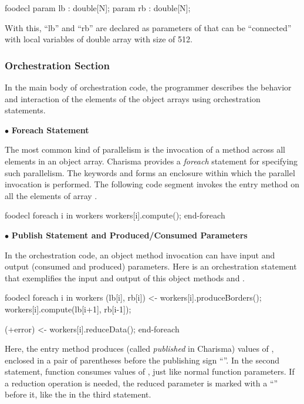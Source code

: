 \begin{SaveVerbatim}{foodecl}
    param lb : double[N];
    param rb : double[N];
\end{SaveVerbatim}

With this, ``lb'' and ``rb'' are declared as parameters of that can be 
``connected'' with local variables of double array with size of 512. 

\subsubsection{Orchestration Section}
\label{sec:orchsec}

In the main body of orchestration code, the programmer describes the behavior
and interaction of the elements of the object arrays using orchestration
statements.

$\bullet$ {\bf Foreach Statement}

The most common kind of parallelism is the invocation of a method
across all elements in an object array. Charisma provides a {\em foreach}
statement for specifying such parallelism. The keywords  and
 forms an enclosure within which the parallel invocation is
performed. The following code segment invokes the entry method  on
all the elements of array . 

\begin{SaveVerbatim}{foodecl}
  foreach i in workers
    workers[i].compute();
  end-foreach
\end{SaveVerbatim}

$\bullet$ {\bf Publish Statement and Produced/Consumed Parameters}

In the orchestration code, an object method invocation can have input and output
(consumed and produced) parameters. Here is an orchestration statement that
exemplifies the input and output of this object methods
 and . 

\begin{SaveVerbatim}{foodecl}
  foreach i in workers
    (lb[i], rb[i]) <- workers[i].produceBorders();
    workers[i].compute(lb[i+1], rb[i-1]);
    
    (+error) <- workers[i].reduceData();
  end-foreach
\end{SaveVerbatim}

Here, the entry method  produces (called {\em
published} in Charisma) values of , enclosed in a pair of
parentheses before the publishing sign ``\code{<-}''. In the second
statement, function  consumes values of , just like normal function parameters. If a reduction operation is
needed, the reduced parameter is marked with a ``\code{+}'' before it, like the
 in the third statement. 

